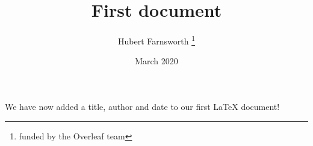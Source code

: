 \documentclass[12pt, letterpaper, twoside]{article}
\title{First document}
\author{Hubert Farnsworth \thanks{funded by the Overleaf team}}
\date{March 2020}
\begin{document}
\maketitle

We have now added a title, author and date to our first \LaTeX{} document!
\end{document}
